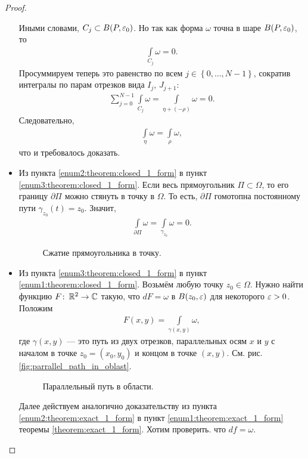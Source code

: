 \documentclass[../complex-analysis.tex]{subfiles}
\begin{document}
\begin{proof}
\begin{itemize}
   Иными словами, $C_j \subset B(P,\varepsilon_0)$. Но так как форма $\omega$ точна в шаре $B(P,\varepsilon_0)$, то
   \begin{align*}
    \int\limits_{C_j} \omega = 0.
   \end{align*} Просуммируем теперь это равенство по всем $j \in \left\{ 0, \ldots,N-1 \right\}$, сократив интегралы по парам отрезков вида $I_j$, $J_{j+1}$:
   \begin{align*}
    \sum_{j=0}^{N-1} \int\limits_{C_j} \omega = \int\limits_{\eta + (- \rho)}  \omega = 0.
   \end{align*} Следовательно,
   \begin{align*}
    \int\limits_{\eta} \omega = \int\limits_{\rho} \omega,  
   \end{align*} что и требовалось доказать.
  \item Из пункта \ref{enum2:theorem:closed_1_form} в пункт \ref{enum3:theorem:closed_1_form}. Если весь прямоугольник $\Pi \subset \Omega$, то его границу $\partial \Pi$ можно стянуть в точку в $\Omega$. То есть, $\partial\Pi$ гомотопна постоянному пути $\gamma_{z_0}(t) = z_0$. Значит,
   \begin{align*}
    \int\limits_{\partial\Pi} \omega = \int\limits_{\gamma_{z_0}}   \omega = 0.
   \end{align*} 
\begin{figure}[ht]
    \centering
    \caption{Сжатие прямоугольника в точку.}
    \label{fig:rectangle_into_point}
\end{figure}

\item Из пункта \ref{enum3:theorem:closed_1_form} в пункт \ref{enum1:theorem:closed_1_form}. Возьмём любую точку $z_0 \in \Omega$. Нужно найти функцию $F \colon\, \mathbb{R}^{2} \to \mathbb{C}$ такую, что $dF = \omega$ в $B(z_0,\varepsilon)$ для некоторого $\varepsilon > 0$. Положим
 \begin{align*}
  F(x,y) = \int\limits_{\gamma(x,y)} \omega,
 \end{align*} где $\gamma(x,y)$ --- это путь из двух отрезков, параллельных осям $x$ и $y$ с началом в точке $z_0 = (x_0, y_0)$ и концом в точке $(x,y)$. См. рис. \eqref{fig:parrallel_path_in_oblast}.

\begin{figure}[ht]
    \centering
    \caption{Параллельный путь в области.}
    \label{fig:parrallel_path_in_oblast}
\end{figure}

	Далее действуем аналогично доказательству из пункта \ref{enum2:theorem:exact_1_form} в пункт \ref{enum1:theorem:exact_1_form} теоремы \ref{theorem:exact_1_form}. Хотим проверить. что $df = \omega$. 


\end{itemize}
\end{proof}
\end{document}
